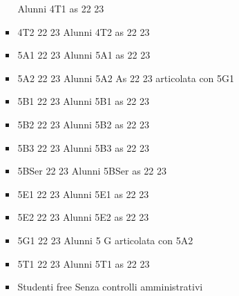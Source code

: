 \begin{itemize}
\begin{itemize}
\begin{itemize}
	Alunni 4T1 as 22 23	
	\item 4T2 22 23
	Alunni 4T2 as 22 23	
	\item 5A1 22 23
	Alunni 5A1 as 22 23	
	\item 5A2 22 23
	Alunni 5A2 As 22 23 articolata con 5G1	
	\item 5B1 22 23
	Alunni 5B1 as 22 23	
	\item 5B2 22 23
	Alunni 5B2 as 22 23	
	\item 5B3 22 23
	Alunni 5B3 as 22 23	
	\item 5BSer 22 23
	Alunni 5BSer as 22 23	
	\item 5E1 22 23
	Alunni 5E1 as 22 23	
	\item 5E2 22 23
	Alunni 5E2 as 22 23	
	\item 5G1 22 23
	Alunni 5 G articolata con 5A2	
	\item 5T1 22 23
	Alunni 5T1 as 22 23	
	\item Studenti free
	Senza controlli amministrativi
\end{itemize}
	\end{itemize}
\end{itemize} 